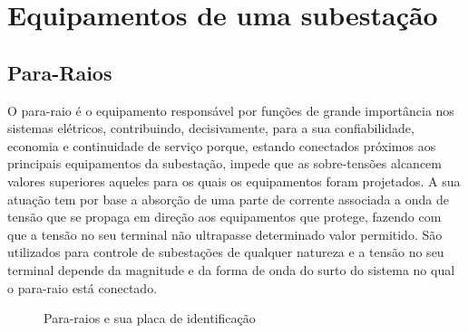 \documentclass[a5paper]{ufsc-thesis}
\begin{document}
\section{Equipamentos de uma subestação}
\subsection{Para-Raios}
O para-raio é o equipamento responsável por funções de grande importância nos sistemas elétricos, contribuindo, decisivamente, para a sua confiabilidade, economia e continuidade de serviço porque, estando conectados próximos aos principais equipamentos da subestação, impede que as sobre-tensões alcancem valores superiores aqueles para os quais os equipamentos foram projetados. A sua atuação tem por base a absorção de uma parte de corrente associada a onda de tensão que se propaga em direção aos equipamentos que protege, fazendo com que a tensão no seu terminal não ultrapasse determinado valor permitido. São utilizados para controle de subestações de qualquer natureza e a tensão no seu terminal depende da magnitude e da forma de onda do surto do sistema no qual o para-raio está conectado.
\begin{figure}[htb]
  \caption{Para-raios e sua placa de identificação}
  \centering
\end{figure}
\end{document}

